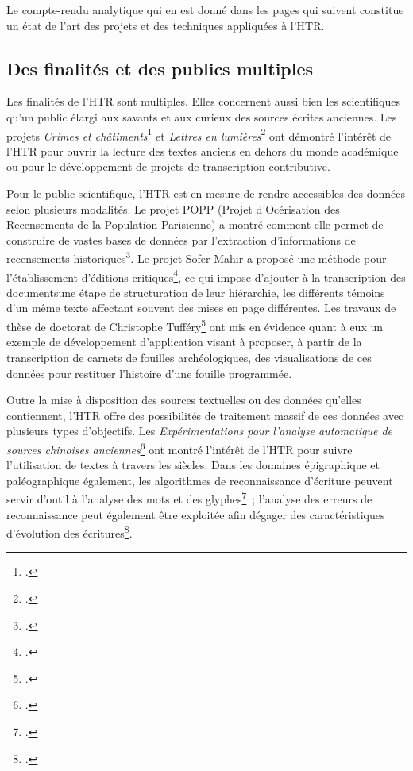 \documentclass[a4paper,12pt,twoside]{book}
\begin{document}
			Le compte-rendu analytique qui en est donné dans les pages qui suivent constitue un état de l'art des projets et des techniques appliquées à l'HTR.
			
			\subsection{Des finalités et des publics multiples}
		
				Les finalités de l'HTR sont multiples. Elles concernent aussi bien les
				scientifiques qu'un public élargi aux savants et aux curieux des sources
				écrites anciennes. Les projets \textit{Crimes et châtiments}\footcite{paupeCursiveXVIIeSiecle2022} et
				\textit{Lettres en lumières}\footcite{fizaineLettresLumieres2022a} ont démontré l'intérêt de l'HTR pour
				ouvrir la lecture des textes anciens en dehors du monde académique ou
				pour le développement de projets de transcription contributive.
				
				Pour le public scientifique, l'HTR est en mesure de rendre accessibles
				des données selon plusieurs modalités. Le projet POPP (Projet
				d'Océrisation des Recensements de la Population Parisienne) a montré
				comment elle permet de construire de vastes bases de données par
				l'extraction d'informations de recensements historiques\footcite{constumReconnaissanceExtractionInformations2022}. Le projet Sofer
				Mahir a proposé une méthode pour l'établissement d'éditions critiques\footcite{stoklbenezraHTRCriticalEdition2022}, ce qui impose d'ajouter à la
				transcription des documentsune étape de structuration de leur
				hiérarchie, les différents témoins d'un même texte affectant souvent des
				mises en page différentes. Les travaux de thèse de doctorat de
				Christophe Tufféry\footcite{tufferyRetourExperiencesUtilisation2022} ont
				mis en évidence quant à eux un exemple de développement d'application
				visant à proposer, à partir de la transcription de carnets de fouilles
				archéologiques, des visualisations de ces données pour restituer
				l'histoire d'une fouille programmée.
				
				Outre la mise à disposition des sources textuelles ou des données
				qu'elles contiennent, l'HTR offre des possibilités de traitement massif
				de ces données avec plusieurs types d'objectifs. Les
				\textit{Expérimentations pour l'analyse automatique de sources chinoises anciennes}\footcite{bizais-lilligExperimentationsPourAnalyse2022} ont
				montré l'intérêt de l'HTR pour suivre l'utilisation de textes à travers
				les siècles. Dans les domaines épigraphique et paléographique également,
				les algorithmes de reconnaissance d'écriture peuvent servir d'outil à
				l'analyse des mots et des glyphes\footcite{boschettiEpiSearchRecognisingAncient2022}~; l'analyse des erreurs de reconnaissance peut également être exploitée afin dégager des
				caractéristiques d'évolution des écritures\footcite{paraskeviHTRHandwrittenPaleographic2022}.
				
\end{document}
